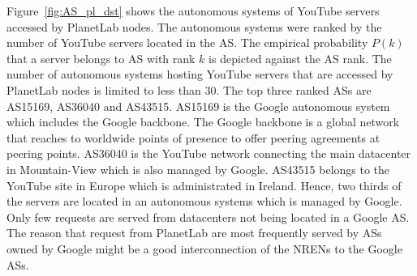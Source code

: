 %

Figure~\ref{fig:AS_pl_dst} shows the autonomous systems of YouTube servers accessed by PlanetLab nodes.
The autonomous systems were ranked by the number of YouTube servers located in the AS.
The empirical probability $P(k)$ that a server belongs to AS with rank $k$ is depicted against the AS rank.
The number of autonomous systems hosting YouTube servers that are accessed by PlanetLab nodes is limited to less than 30.
The top three ranked ASs are AS15169, AS36040 and AS43515.
AS15169 is the Google autonomous system which includes the Google backbone.
The Google backbone is a global network that reaches to worldwide points of presence to offer peering agreements at peering points.
AS36040 is the YouTube network connecting the main datacenter in Mountain-View which is also managed by Google.
AS43515 belongs to the YouTube site in Europe which is administrated in Ireland.
Hence, two thirds of the servers are located in an autonomous systems which is managed by Google.
Only few requests are served from datacenters not being located in a Google AS.
The reason that request from PlanetLab are most frequently served by ASs owned by Google might be a good interconnection of the NRENs to the Google ASs.

